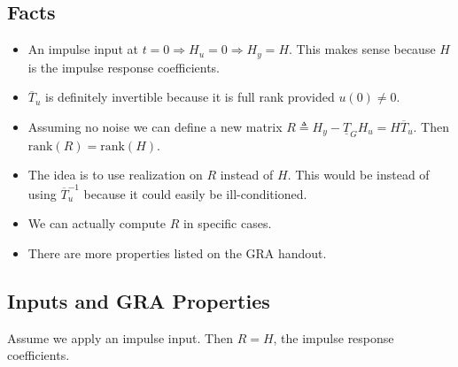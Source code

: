 \subsection{Facts}
\begin{itemize}
\item An impulse input at $t=0\Rightarrow H_u=0\Rightarrow H_y=H$. This makes sense because $H$ is the impulse response coefficients.
\item $\overline{T}_u$ is definitely invertible because it is full rank provided $u(0)\neq0$.
\item Assuming no noise we can define a new matrix $R\triangleq H_y-\underline{T}_GH_u = H\overline{T}_u$. Then $\text{rank}(R) = \text{rank}(H)$.
\item The idea is to use realization on $R$ instead of $H$. This would be instead of using $\overline{T}_u^{-1}$ because it could easily be ill-conditioned.
\item We can actually compute $R$ in specific cases.
\item There are more properties listed on the GRA handout.
\end{itemize}

\subsection{Inputs and GRA Properties}
Assume we apply an impulse input. Then $R=H$, the impulse response coefficients.

